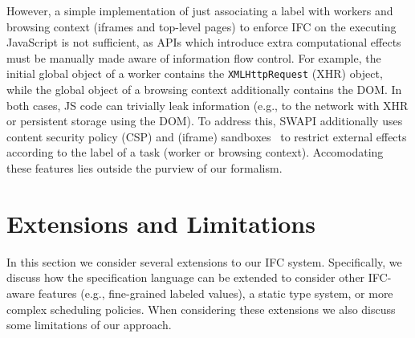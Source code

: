 \documentclass{sigplanconf}
\newcommand{\Red}[1]{{\color{red} #1}}
\newcommand{\tocite}[1]{\Red{\cite{#1}}}
\begin{document}
However, a simple implementation of just associating a label with
workers and browsing context (iframes and top-level pages) to enforce
IFC on the executing JavaScript is not sufficient, as APIs which
introduce extra computational effects must be manually made aware of information flow
control.
%
For example, the initial global object of a worker contains the
\texttt{XMLHttpRequest} (XHR) object, while the global object of a
browsing context additionally contains the DOM.
%
In both cases, JS code can trivially leak information (e.g., to the
network with XHR or persistent storage using the DOM).
%
To address this, SWAPI additionally uses content security policy (CSP) and
(iframe) sandboxes~\cite{csp1.1,html5} to restrict external effects according
to the label of a task (worker or browsing context).  Accomodating these
features lies outside the purview of our formalism.

\section{Extensions and Limitations}
\label{sec:extensions}

In this section we consider several extensions to our IFC system.
%
Specifically, we discuss how the specification language can be
extended to consider other IFC-aware features (e.g., fine-grained
labeled values), a static type system, or more complex scheduling
policies.
%
When considering these extensions we also discuss some limitations
of our approach.
\end{document}
